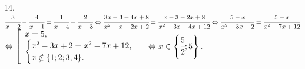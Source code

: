14. $\cfrac{3}{x-2}-\cfrac{4}{x-1}=\cfrac{1}{x-4}-\cfrac{2}{x-3}\Leftrightarrow \cfrac{3x-3-4x+8}{x^2-x-2x+2}=\cfrac{x-3-2x+8}{x^2-3x-4x+12}\Leftrightarrow
\cfrac{5-x}{x^2-3x+2}=\cfrac{5-x}{x^2-7x+12}$\\$\Leftrightarrow \left[\begin{array}{l} x=5,\\ \begin{cases} x^2-3x+2=x^2-7x+12,\\ x\notin\{1;2;3;4\}.\end{cases}\end{array}\right.\Leftrightarrow x\in\left\{\cfrac{5}{2};5\right\}.$\\
